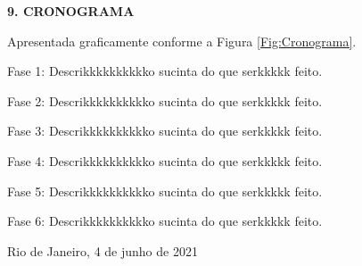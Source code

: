 \documentclass[a4paper,12pt,oneside,openany]{report}
\begin{document}
\vspace{0.4cm}
\textbf{9. CRONOGRAMA}

Apresentada graficamente conforme a Figura \ref{Fig:Cronograma}.

Fase 1: Descrikkkkkkkkkko sucinta do que serkkkkk feito.

Fase 2: Descrikkkkkkkkkko sucinta do que serkkkkk feito.

Fase 3: Descrikkkkkkkkkko sucinta do que serkkkkk feito.

Fase 4: Descrikkkkkkkkkko sucinta do que serkkkkk feito.

Fase 5: Descrikkkkkkkkkko sucinta do que serkkkkk feito.

Fase 6: Descrikkkkkkkkkko sucinta do que serkkkkk feito.



 


\vspace{2cm}
\noindent
Rio de Janeiro, 4 de junho de 2021

\vspace{0.5cm}
\begin{flushright}
      \parbox{10cm}{
      \hrulefill

      \vspace{-.375cm}

      \vspace{0.9cm}
      \hrulefill

      \vspace{-.375cm}

      \vspace{0.9cm}
      }
\end{flushright}
\vfill
      
\end{document}
